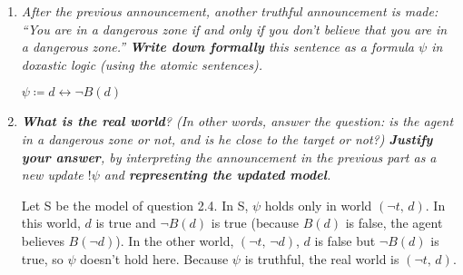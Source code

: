 \documentclass[leqno]{article}
\begin{document}
\begin{enumerate}
    \begin{center}
    \end{center}

    \item \textit{After the previous announcement, another truthful 
    announcement is made: ``You are in a dangerous zone if and only if you 
    don't believe that you are in a dangerous zone.'' \textbf{Write down 
    formally} this sentence as a formula $\psi$ in doxastic logic (using the 
    atomic sentences).}

    $\psi \coloneqq d \leftrightarrow \neg B(d)$

    \item \textit{\textbf{What is the real world}? (In other words, answer the 
    question: is the agent in a dangerous zone or not, and is he close to the 
    target or not?) \textbf{Justify your answer}, by interpreting the 
    announcement in the previous part as a new update $!\psi$ and 
    \textbf{representing the updated model}.}

	Let S be the model of question 2.4. In S, $\psi$ holds only in world 
	$(\neg t, \, d)$. In this world, $d$ is true and $\neg B(d)$ is true (because 
	$B(d)$ is false, the agent believes $B(\neg d)$). In the other world, 
	$(\neg t, \, \neg d)$, $d$ is false but $\neg B(d)$ is true, so $\psi$ doesn't
	 hold here. Because $\psi$ is truthful, the real world is $(\neg t, \, d)$.


\end{enumerate}
\end{document}
